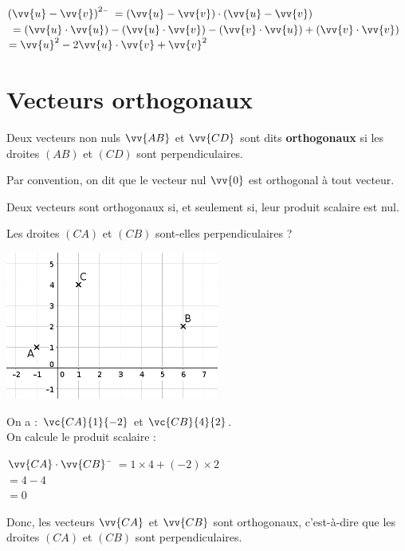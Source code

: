 \documentclass[a4paper,11pt,cours]{nsi} %
\begin{document}
\begin{demonstration}[ (du point 2)]
    \begin{tabbing}
        $\left(\vv{u}-\vv{v}\right)^2$ \= $=\left(\vv{u}-\vv{v}\right) \cdot \left(\vv{u}-\vv{v}\right)$\\
        \> $=\left(\vv{u} \cdot \vv{u}\right) - \left(\vv{u} \cdot \vv{v}\right) - \left(\vv{v} \cdot \vv{u}\right) + \left(\vv{v} \cdot \vv{v}\right)$\\
        \> $=\vv{u}^2 - 2\vv{u} \cdot \vv{v}  + \vv{v}^2$
    \end{tabbing}
\end{demonstration}

\section{Vecteurs orthogonaux}
\begin{definition}[]
    Deux vecteurs non nuls $\vv{AB}$ et $\vv{CD}$ sont dits \textbf{orthogonaux} si les droites $(AB)$ et $(CD)$ sont perpendiculaires.
\end{definition}

\begin{remarque}[]
    Par convention, on dit que le vecteur nul $\vv{0}$ est orthogonal à tout vecteur.
\end{remarque}

\begin{propriete}[]
    Deux vecteurs sont orthogonaux si, et seulement si, leur produit scalaire est nul.
\end{propriete}

\begin{exemple}[]
    Les droites $(CA)$ et $(CB)$ sont-elles perpendiculaires ?
    \begin{center}
        \includegraphics[width=7cm]{exemple6.png}
    \end{center}
    On a : $\vc{CA}{1}{-2}$ et $\vc{CB}{4}{2}$.\\[.5em]
    On calcule le produit scalaire :
    \begin{tabbing}
        $\vv{CA} \cdot \vv{CB}$ \= $=1\times 4 + (-2)\times 2$\\
        \> $=4 - 4$\\
        \> $=0$
    \end{tabbing}
    Donc, les vecteurs $\vv{CA}$ et $\vv{CB}$ sont orthogonaux, c'est-à-dire que les
    droites $(CA)$ et $(CB)$ sont perpendiculaires.
\end{exemple}
\end{document}

